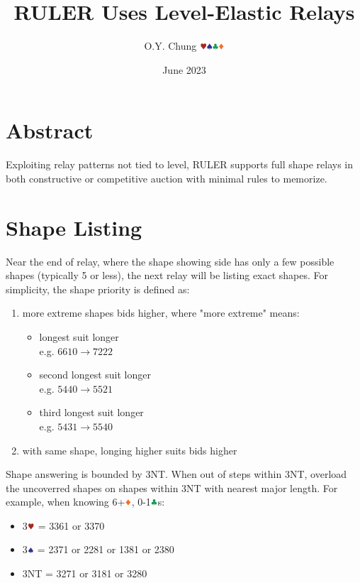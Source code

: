 \documentclass{article}
\title{RULER Uses Level-Elastic Relays}
\author{O.Y. Chung $\hhh\sss\ccc\ddd$}
\date{June 2023}
\newcommand*{\ccc}{\textcolor{ForestGreen}{\clubsuit}}
\newcommand*{\ddd}{\textcolor{Orange}{\vardiamondsuit}}
\newcommand*{\hhh}{\textcolor{Mahogany}{\varheartsuit}}
\newcommand*{\sss}{\textcolor{Blue}{\spadesuit}}
\begin{document}
\begin{CJK*}{UTF8}{gbsn}
\end{CJK*}
\maketitle

\begin{multicols}{2}

\section{Abstract}
Exploiting relay patterns not tied to level, RULER supports full shape relays in both constructive or competitive auction with minimal rules to memorize.

\section{Shape Listing}
Near the end of relay, where the shape showing side has only a few possible shapes (typically 5 or less), the next relay will be listing exact shapes. For simplicity, the shape priority is defined as:

\begin{enumerate}
    \setlength\itemsep{-0.2em}
    \item more extreme shapes bids higher, where "more extreme" means:
    \begin{itemize}
        \setlength\itemsep{-0.2em}
        \item longest suit longer \\
            e.g. $6610 \rightarrow 7222$
        \item second longest suit longer \\
            e.g. $5440 \rightarrow 5521$
        \item third longest suit longer \\
            e.g. $5431 \rightarrow 5540$
    \end{itemize}
    \item with same shape, longing higher suits bids higher
\end{enumerate}

\noindent Shape answering is bounded by 3NT. When out of steps within 3NT, overload the uncoverred shapes on shapes within 3NT with nearest major length. For example, when knowing 6+$\ddd$, 0-1$\ccc$s:
\begin{itemize}
    \setlength\itemsep{-0.2em}
    \item 3$\hhh$ = 3361 or 3370
    \item 3$\sss$ = 2371 or 2281 or 1381 or 2380
    \item 3NT = 3271 or 3181 or 3280
\end{itemize}


\end{multicols}
\end{document}
